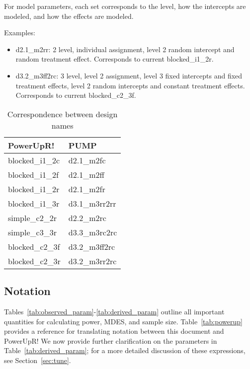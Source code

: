 \documentclass[12pt]{article}
\begin{document}
For model parameters, each set corresponds to the level, how the intercepts are modeled, and how the effects are modeled.

Examples:
\begin{itemize}
\item d2.1\_m2rr: 2 level, individual assignment, level 2 random intercept and random treatment effect.  Corresponds to current blocked\_i1\_2r.
\item d3.2\_m3ff2rc: 3 level, level 2 assignment, level 3 fixed intercepts and fixed treatment effects, level 2 random intercepts and constant treatment effects. Corresponds to current blocked\_c2\_3f.
\end{itemize}

\begin{table}[h!]
\begin{tabular}{l | l}
\textbf{PowerUpR!}	& \textbf{PUMP} \\ \hline
blocked\_i1\_2c 	& d2.1\_m2fc \\
blocked\_i1\_2f 	& d2.1\_m2ff \\
blocked\_i1\_2r 	& d2.1\_m2fr \\
blocked\_i1\_3r 	& d3.1\_m3rr2rr \\
simple\_c2\_2r 		& d2.2\_m2rc \\
simple\_c3\_3r 		& d3.3\_m3rc2rc \\
blocked\_c2\_3f 	& d3.2\_m3ff2rc \\
blocked\_c2\_3r 	& d3.2\_m3rr2rc \\
\end{tabular}
\caption{Correspondence between design names\label{tab:names}}
\end{table}






\subsection{Notation}
\label{sec:notation}

Tables~\ref{tab:observed_param}-\ref{tab:derived_param} outline all important quantities for calculating power, MDES, and sample size.
Table~\ref{tab:powerup} provides a reference for translating notation between this document and PowerUpR!
We now provide further clarification on the parameters in Table~\ref{tab:derived_param}; for a more detailed discussion of these expressions, see Section~\ref{sec:tune}.
\end{document}
